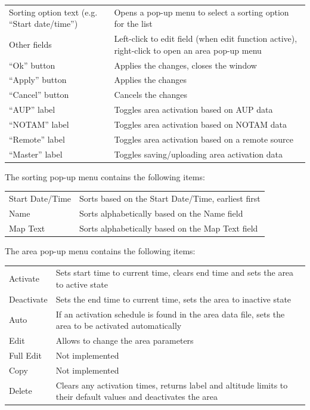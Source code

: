 \documentclass[a4paper,oneside,11pt]{memoir}
\begin{document}
\begin{longtable}{p{2.5cm} p{10cm}}
  Sorting option text (e.g. “Start date/time”)  & Opens a pop-up menu to select a sorting option for the list\\
  Other fields                                  & Left-click to edit field (when edit function active), right-click to open an area pop-up menu\\
  “Ok” button                                   &  Applies the changes, closes the window\\
  “Apply” button                                & Applies the changes\\
  “Cancel” button                               & Cancels the changes\\
  “AUP” label                                   & Toggles area activation based on AUP data \\
  “NOTAM” label                                 & Toggles area activation based on NOTAM data\\
  “Remote” label                                & Toggles area activation based on a remote source\\
  “Master” label                                & Toggles saving/uploading area activation data\\
\end{longtable}

The sorting pop-up menu contains the following items:

\begin{longtable}{p{2.5cm} p{10cm}}
  Start Date/Time   & Sorts based on the Start Date/Time, earliest first\\
  Name              & Sorts alphabetically based on the Name field\\
  Map Text          & Sorts alphabetically based on the Map Text field \\
\end{longtable}

The area pop-up menu contains the following items:

\begin{longtable}{p{2.5cm} p{10cm}}
  Activate    & Sets start time to current time, clears end time and sets the area to active state                    \\
  Deactivate  & Sets the end time to current time, sets the area to inactive state                                    \\
  Auto        & If an activation schedule is found in the area data file, sets the area to be activated automatically \\
  Edit        & Allows to change the area parameters\\
  Full Edit   & Not implemented\\
  Copy        & Not implemented\\
  Delete      & Clears any activation times, returns label and altitude limits to their default values and deactivates the area\\
\end{longtable}
\end{document}
